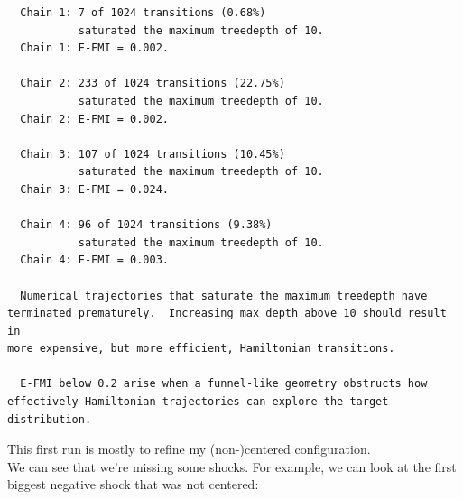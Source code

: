 \documentclass[
  letterpaper,
  DIV=11,
  numbers=noendperiod]{scrartcl}
\begin{document}
\begin{verbatim}
  Chain 1: 7 of 1024 transitions (0.68%)
           saturated the maximum treedepth of 10.
  Chain 1: E-FMI = 0.002.

  Chain 2: 233 of 1024 transitions (22.75%)
           saturated the maximum treedepth of 10.
  Chain 2: E-FMI = 0.002.

  Chain 3: 107 of 1024 transitions (10.45%)
           saturated the maximum treedepth of 10.
  Chain 3: E-FMI = 0.024.

  Chain 4: 96 of 1024 transitions (9.38%)
           saturated the maximum treedepth of 10.
  Chain 4: E-FMI = 0.003.

  Numerical trajectories that saturate the maximum treedepth have
terminated prematurely.  Increasing max_depth above 10 should result in
more expensive, but more efficient, Hamiltonian transitions.

  E-FMI below 0.2 arise when a funnel-like geometry obstructs how
effectively Hamiltonian trajectories can explore the target
distribution.
\end{verbatim}

\linespread{2}

This first run is mostly to refine my (non-)centered configuration.\\
We can see that we're missing some shocks. For example, we can look at
the first biggest negative shock that was not centered:

\linespread{0.5}
\end{document}

